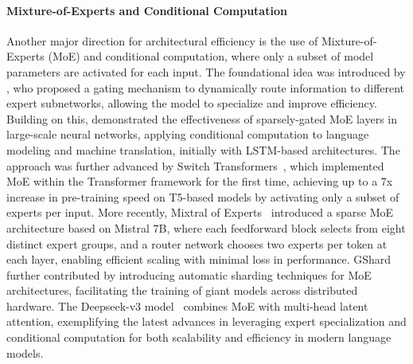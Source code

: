 \paragraph{Mixture-of-Experts and Conditional Computation}
Another major direction for architectural efficiency is the use of Mixture-of-Experts (MoE) and conditional computation, where only a subset of model parameters are activated for each input. The foundational idea was introduced by \citet{jacobs1991adaptive}, who proposed a gating mechanism to dynamically route information to different expert subnetworks, allowing the model to specialize and improve efficiency. Building on this, \citet{shazeer2017outrageously} demonstrated the effectiveness of sparsely-gated MoE layers in large-scale neural networks, applying conditional computation to language modeling and machine translation, initially with LSTM-based architectures. The approach was further advanced by Switch Transformers~\citep{fedus2021switch}, which implemented MoE within the Transformer framework for the first time, achieving up to a 7x increase in pre-training speed on T5-based models by activating only a subset of experts per input. More recently, Mixtral of Experts~\citep{jiang2024mixtral} introduced a sparse MoE architecture based on Mistral 7B, where each feedforward block selects from eight distinct expert groups, and a router network chooses two experts per token at each layer, enabling efficient scaling with minimal loss in performance.  GShard~\citep{lepikhin2020gshard} further contributed by introducing automatic sharding techniques for MoE architectures, facilitating the training of giant models across distributed hardware. The Deepseek-v3 model~\citep{deepseek2024v3} combines MoE with multi-head latent attention, exemplifying the latest advances in leveraging expert specialization and conditional computation for both scalability and efficiency in modern language models.


